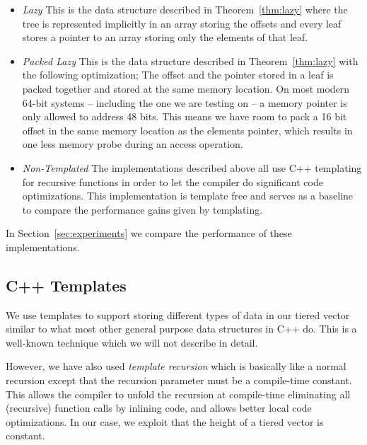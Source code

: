 \begin{itemize}
    \item \textit{Lazy}
        This is the data structure described in Theorem~\ref{thm:lazy}
        where the tree is represented implicitly in an array
        storing the offsets and every leaf stores a pointer to an array
        storing only the elements of that leaf.

    \item \textit{Packed Lazy}
        This is the data structure described in Theorem~\ref{thm:lazy}
        with the following optimization;
        The offset and the pointer stored in a leaf
        is packed together and stored at the same memory location.
        On most modern 64-bit systems -- including the one we are testing on
        -- a memory pointer is only allowed to address 48 bits.
        This means we have room to pack a 16 bit offset
        in the same memory location as the elements pointer,
        which results in one less memory probe during an access operation.

    \item \textit{Non-Templated}
            The implementations described above all use C++ templating
            for recursive functions
            in order to let the compiler do significant code optimizations.
            This implementation is template free and serves as a baseline
            to compare the performance gains given by templating.

    \end{itemize}
In Section~\ref{sec:experiments} we compare the performance of
these implementations.

\subsection{C++ Templates}

We use templates to support storing different types of data in our tiered
vector similar to what most other general purpose data structures in C++ do.
This is a well-known technique which we will not describe in detail.

However, we have also used \textit{template recursion} which is basically like a normal recursion except that the recursion parameter must be a compile-time constant. This allows the compiler to unfold the recursion at compile-time eliminating all (recursive) function calls by inlining code, and allows better local code optimizations. In our case, we exploit that the height of a tiered vector is constant.

